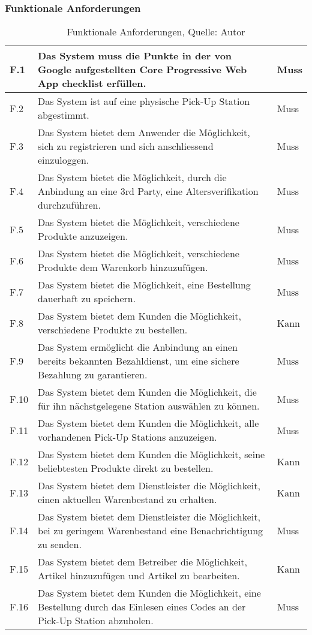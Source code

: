 \subsubsection{Funktionale Anforderungen}\label{funktionaleAnforderungen}
\begin{table}[H]
	\setlength\extrarowheight{2pt} %
	\begin{tabularx}{\textwidth}{|l|X|l|}
		\hline
		F.1 & Das System muss die Punkte in der von Google aufgestellten Core Progressive Web App checklist erfüllen. \cite{pwaChecklist} & Muss \\
		\hline
		F.2 & Das System ist auf eine physische Pick-Up Station abgestimmt. & Muss \\
		\hline
		F.3 & Das System bietet dem Anwender die Möglichkeit, sich zu registrieren und sich anschliessend einzuloggen. & Muss \\
		\hline
		F.4 & Das System bietet die Möglichkeit, durch die Anbindung an eine 3rd Party, eine Altersverifikation durchzuführen.  & Muss \\
		\hline
		F.5 & Das System bietet die Möglichkeit, verschiedene Produkte anzuzeigen. & Muss \\
		\hline
		F.6 & Das System bietet die Möglichkeit, verschiedene Produkte dem Warenkorb hinzuzufügen. & Muss \\
		\hline
		F.7& Das System bietet die Möglichkeit, eine Bestellung dauerhaft zu speichern. & Muss \\
		\hline
		F.8 & Das System bietet dem Kunden die Möglichkeit, verschiedene Produkte zu bestellen. & Kann \\
		\hline
		F.9 & Das System ermöglicht die Anbindung an einen bereits bekannten Bezahldienst, um eine sichere Bezahlung zu garantieren. & Muss \\
		\hline
		F.10 & Das System bietet dem Kunden die Möglichkeit, die für ihn nächstgelegene Station auswählen zu können.  & Muss \\
		\hline
		F.11 & Das System bietet dem Kunden die Möglichkeit, alle vorhandenen Pick-Up Stations anzuzeigen.  & Muss \\
		\hline
		F.12 & Das System bietet dem Kunden die Möglichkeit, seine beliebtesten Produkte direkt zu bestellen. & Kann \\
		\hline
		F.13 & Das System bietet dem Dienstleister die Möglichkeit, einen aktuellen Warenbestand zu erhalten. & Kann \\
		\hline
		F.14 & Das System bietet dem Dienstleister die Möglichkeit, bei zu geringem Warenbestand eine Benachrichtigung zu senden. & Muss \\
		\hline
		F.15 & Das System bietet dem Betreiber die Möglichkeit, Artikel hinzuzufügen und Artikel zu bearbeiten. & Kann \\
		\hline
		F.16 & Das System bietet dem Kunden die Möglichkeit, eine Bestellung durch das Einlesen eines Codes an der Pick-Up Station abzuholen. & Muss \\
		\hline
		
		
	\end{tabularx}
	\caption{ \label{tbl: FunktionaleAnforderungent}Funktionale Anforderungen, Quelle: Autor}
\end{table}
